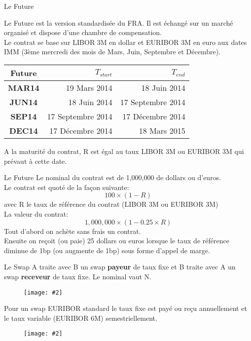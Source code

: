 \documentclass{beamer}
\newcommand{\FIG}[2]{\texttt{[image: \#2]}}
\begin{document}
\begin{frame}{Le Future}

Le Future est la version standardisée du FRA. Il est échangé sur un marché organisé et dispose d'une chambre de compensation.\\
Le contrat se base sur LIBOR 3M en dollar et EURIBOR 3M en euro aux dates IMM (3ème mercredi des mois de Mars, Juin, Septembre et Décembre).\\
\begin{center}
\begin{tabular}{|c|r|r|}
  \hline
  \textbf{Future} & \textbf{$T_{start}$} & \textbf{$T_{end}$} \\
  \hline
  \textbf{MAR14} & 19 Mars 2014 & 18 Juin 2014 \\
  \textbf{JUN14} & 18 Juin 2014 & 17 Septembre 2014 \\
  \textbf{SEP14} & 17 Septembre 2014 & 17 Décembre 2014 \\
  \textbf{DEC14} & 17 Décembre 2014 &  18 Mars 2015 \\
  \hline
\end{tabular}
\end{center}
A la maturité du contrat, R est égal au taux LIBOR 3M ou EURIBOR 3M qui prévaut à cette date.
\end{frame}

\begin{frame}{Le Future}
Le nominal du contrat est de 1,000,000 de dollars ou d'euros.\\
Le contrat est quoté de la façon suivante:
\[
100\times(1 - R)
\] 
avec R le taux de référence du contrat (LIBOR 3M ou EURIBOR 3M)\\
La valeur du contrat:
\[
1,000,000\times(1-0.25\times R)
\]
Tout d'abord on achète sans frais un contrat.\\
Ensuite on reçoit (ou paie) 25 dollars ou euros lorsque le taux de référence diminue de 1bp (ou augmente de 1bp) sous forme d'appel de marge.
\end{frame}

\begin{frame}{Le Swap}
A traite avec B un swap \textbf{payeur} de taux fixe et B traite avec A un swap \textbf{receveur} de taux fixe. Le nominal vaut N.
\begin{figure}[h]
\FIG{5cm}{figures/schema_swap_1.jpg}
\end{figure}
Pour un swap EURIBOR standard le taux fixe est payé ou reçu annuellement et le taux variable (EURIBOR 6M) semestriellement.
\begin{figure}[h]
\FIG{7cm}{figures/schema_swap_2.jpg}
\end{figure}
\end{frame}
\end{document}
